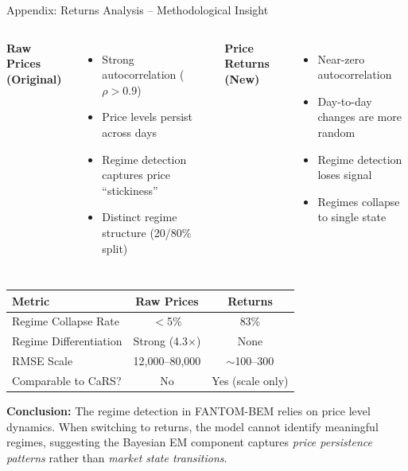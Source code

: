 \documentclass[aspectratio=169]{beamer}
\begin{document}
\begin{frame}{Appendix: Returns Analysis -- Methodological Insight}
\begin{columns}[T]
\textbf{Raw Prices (Original)}
\begin{itemize}
    \item Strong autocorrelation ($\rho > 0.9$)
    \item Price levels persist across days
    \item Regime detection captures price ``stickiness''
    \item Distinct regime structure (20/80\% split)
\end{itemize}

\textbf{Price Returns (New)}
\begin{itemize}
    \item Near-zero autocorrelation
    \item Day-to-day changes are more random
    \item Regime detection loses signal
    \item Regimes collapse to single state
\end{itemize}
\end{columns}

\begin{table}
\centering
\scriptsize
\begin{tabular}{l|c|c}
\toprule
\textbf{Metric} & \textbf{Raw Prices} & \textbf{Returns} \\
\midrule
Regime Collapse Rate & $<$5\% & 83\% \\
Regime Differentiation & Strong (4.3$\times$) & None \\
RMSE Scale & 12,000--80,000 & $\sim$100--300 \\
Comparable to CaRS? & No & Yes (scale only) \\
\bottomrule
\end{tabular}
\end{table}

{\scriptsize \textbf{Conclusion:} The regime detection in FANTOM-BEM relies on price level dynamics. When switching to returns, the model cannot identify meaningful regimes, suggesting the Bayesian EM component captures \textit{price persistence patterns} rather than \textit{market state transitions}.}
\end{frame}
\end{document}

